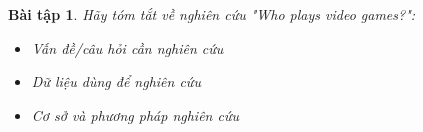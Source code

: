 \documentclass[14pt, a4paper]{article}
\theoremstyle{sltheorem}
\newtheorem{baitap}{Bài tập}
\theoremstyle{soltheorem}
\begin{document}
\begin{titlepage}





    \vfill %

\end{titlepage}

\nocite{*}

\newpage

\begin{baitap}
    Hãy tóm tắt về nghiên cứu "Who plays video games?":
    \begin{itemize}
        \item Vấn đề/câu hỏi cần nghiên cứu
        \item Dữ liệu dùng để nghiên cứu
        \item Cơ sở và phương pháp nghiên cứu
    \end{itemize}
\end{baitap}
\end{document}

